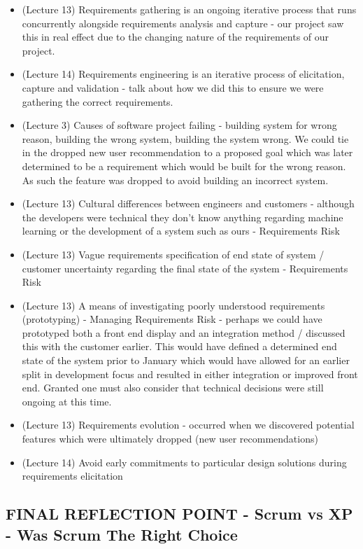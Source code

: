 \documentclass{l3proj}
\begin{document}
\begin{itemize}
\item (Lecture 13) Requirements gathering is an ongoing iterative process that runs concurrently alongside requirements analysis and capture - our project saw this in real effect due to the changing nature of the requirements of our project.
\item (Lecture 14) Requirements engineering is an iterative process of elicitation, capture and validation - talk about how we did this to ensure we were gathering the correct requirements.
\item (Lecture 3) Causes of software project failing - building system for wrong reason, building the wrong system, building the system wrong. We could tie in the dropped new user recommendation to a proposed goal which was later determined to be a requirement which would be built for the wrong reason. As such the feature was dropped to avoid building an incorrect system.
\item (Lecture 13) Cultural differences between engineers and customers - although the developers were technical they don’t know anything regarding machine learning or the development of a system such as ours - Requirements Risk
\item (Lecture 13) Vague requirements specification of end state of system / customer uncertainty regarding the final state of the system - Requirements Risk
\item (Lecture 13) A means of investigating poorly understood requirements (prototyping) - Managing Requirements Risk - perhaps we could have prototyped both a front end display and an integration method / discussed this with the customer earlier. This would have defined a determined end state of the system prior to January which would have allowed for an earlier split in development focus and resulted in either integration or improved front end. Granted one must also consider that technical decisions were still ongoing at this time.
\item (Lecture 13) Requirements evolution - occurred when we discovered potential features which were ultimately dropped (new user recommendations)
\item (Lecture 14)  Avoid early commitments to particular design solutions during requirements elicitation
\end{itemize}



\subsection{FINAL REFLECTION POINT - Scrum vs XP - Was Scrum The Right Choice}
\label{sec:scrumvsxp}
\end{document}
